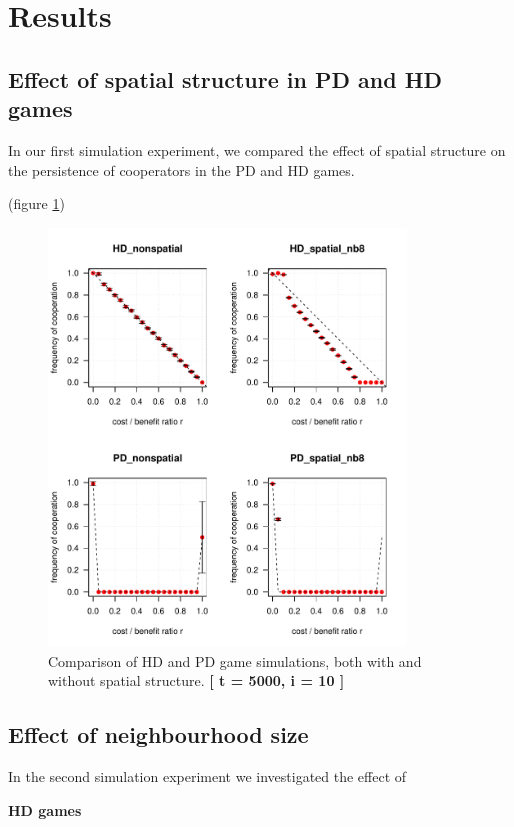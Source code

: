 
\section{Results}


\subsection{Effect of spatial structure in PD and HD games}

In our first simulation experiment, we compared the effect of spatial structure on the persistence of cooperators in the PD and HD games.


(figure \ref{fig: task1_4plot})



\begin{figure}[H]
	\centering 
	\includegraphics[width=9.5cm]{task1_4plot}
	\caption{Comparison of HD and PD game simulations, both with and without spatial structure.  \textbf{[ t = 5000, i = 10 ]} }\label{fig: task1_4plot}
\end{figure}






\subsection{Effect of neighbourhood size}

In the second simulation experiment we investigated the effect of 

\textbf{HD games}

